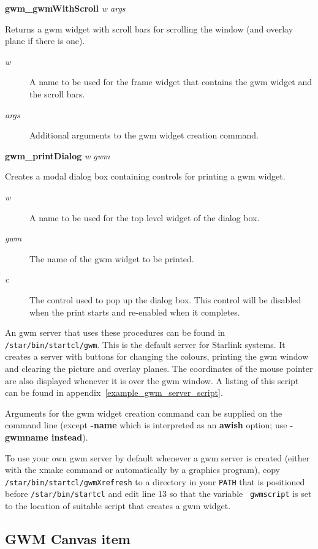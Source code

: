 {\bf gwm\_gwmWithScroll} {\em w args}
\begin{rquote}
Returns a gwm widget with scroll bars for scrolling the window (and  overlay
plane if there is one).
\begin{description}
\item[{\em w}] A name to be used for the frame widget that contains the gwm
widget and the scroll bars.
\item[{\em args}] Additional arguments to the gwm widget creation command.
\end{description}
\end{rquote}

{\bf gwm\_printDialog} {\em w gwm}
\begin{rquote}
Creates a modal dialog box containing controls for printing a gwm widget.
\begin{description}
\item[{\em w}] A name to be used for the top level widget of the dialog box.
\item[{\em gwm}] The name of the gwm widget to be printed.
\item[{\em c}] The control used to pop up the dialog box. This control will
be disabled when the print starts and re-enabled when it completes.
\end{description}
\end{rquote}

An gwm server that uses these procedures can be found in
{\tt{/star/bin/startcl/gwm}}.  This is the default server for Starlink
systems.  It creates a server with buttons for changing the colours,
printing the gwm window and clearing the picture and overlay planes.
The coordinates of the mouse pointer are also displayed whenever it is
over the gwm window.  A listing of this script can be found in
appendix~\ref{example_gwm_server_script}.

Arguments for the gwm widget creation command can be supplied on the command
line (except {\bf -name} which is interpreted as an {\bf awish} option; use
{\bf -gwmname instead}).

To use your own gwm server by default whenever a gwm server
is created (either with the xmake command or automatically by a
graphics program), copy {\tt{/star/bin/startcl/gwmXrefresh}} to a
directory in your {\tt{PATH}} that is positioned before
{\tt{/star/bin/startcl}} and edit line 13 so that the variable {\tt
gwmscript} is set to the location of suitable script that creates a gwm
widget.

\subsection{\label{gwm_canvas_item}GWM Canvas item}

